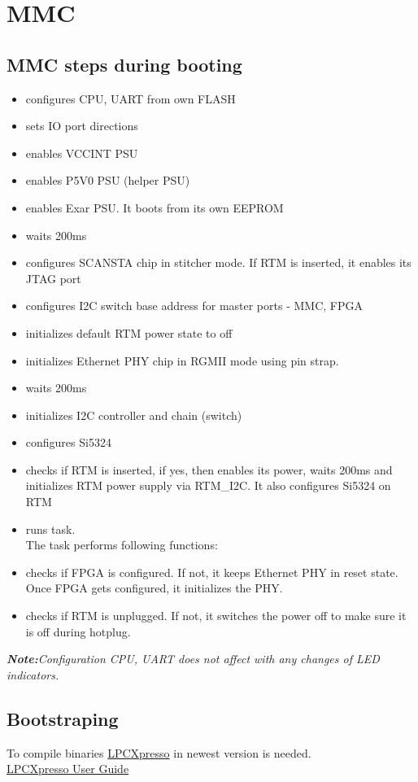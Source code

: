 \section{MMC}

\subsection{MMC steps during booting}

\begin{itemize}

\item configures CPU, UART from own FLASH 
\item sets IO port directions
\item enables VCCINT PSU
\item enables P5V0 PSU (helper PSU)
\item enables Exar PSU. It boots from its own EEPROM
\item waits 200ms
\item configures SCANSTA chip in stitcher mode. If RTM is inserted, it enables its JTAG port
\item configures I2C switch base address for master ports - MMC, FPGA
\item initializes default RTM power state to off
\item initializes Ethernet PHY chip in RGMII mode using pin strap.
\item waits 200ms
\item initializes I2C controller and chain (switch)
\item configures Si5324
\item checks if RTM is inserted, if yes, then enables its power, waits 200ms and initializes RTM power supply via RTM\_I2C. It also configures Si5324 on RTM
\item runs task.\\
 
The task performs following functions:

\item checks if FPGA is configured. If not, it keeps Ethernet PHY in reset state. Once FPGA gets configured, it initializes the PHY.
\item checks if RTM is unplugged. If not, it switches the power off to make sure it is off during hotplug.
\end{itemize}
\textit{\textbf{Note:}Configuration CPU, UART does not affect with any changes of LED indicators.}


\subsection{Bootstraping}
To compile binaries \href{https://www.nxp.com/products/processors-and-microcontrollers/arm-based-processors-and-mcus/lpc-cortex-m-mcus/lpc1100-cortex-m0-plus-m0/lpcxpresso-ide-v8.2.2:LPCXPRESSO?tab=Design_Tools_Tab}{LPCXpresso} in newest version is needed.\\
\href{https://www.nxp.com/docs/en/user-guide/LPCXpresso_IDE_User_Guide.pdf}{LPCXpresso User Guide}

